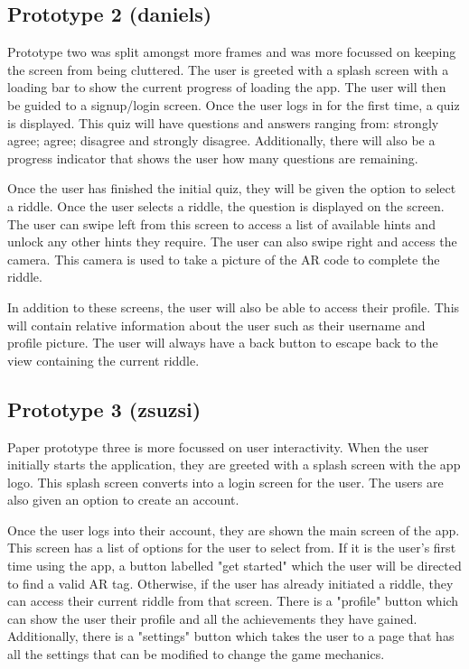 \documentclass[10pt,twocolumn]{article} %
\begin{document}
\subsection*{Prototype 2 (daniels)}
Prototype two was split amongst more frames and was more focussed on keeping the screen from being cluttered. The user is greeted with a splash screen with a loading bar to show the current progress of loading the app. The user will then be guided to a signup/login screen. Once the user logs in for the first time, a quiz is displayed. This quiz will have questions and answers ranging from: strongly agree; agree; disagree and strongly disagree. Additionally, there will also be a progress indicator that shows the user how many questions are remaining. 

Once the user has finished the initial quiz, they will be given the option to select a riddle. Once the user selects a riddle, the question is displayed on the screen. The user can swipe left from this screen to access a list of available hints and unlock any other hints they require. The user can also swipe right and access the camera. This camera is used to take a picture of the AR code to complete the riddle. 

In addition to these screens, the user will also be able to access their profile. This will contain relative information about the user such as their username and profile picture. The user will always have a back button to escape back to the view containing the current riddle.

\subsection*{Prototype 3 (zsuzsi)}
Paper prototype three is more focussed on user interactivity. When the user initially starts the application, they are greeted with a splash screen with the app logo. This splash screen converts into a login screen for the user. The users are also given an option to create an account.

Once the user logs into their account, they are shown the main screen of the app. This screen has a list of options for the user to select from. If it is the user's first time using the app, a button labelled "get started" which the user will be directed to find a valid AR tag. Otherwise, if the user has already initiated a riddle, they can access their current riddle from that screen. There is a "profile" button which can show the user their profile and all the achievements they have gained. Additionally, there is a "settings" button which takes the user to a page that has all the settings that can be modified to change the game mechanics.
\end{document}
